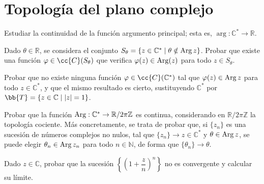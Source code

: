 \section{Topología del plano complejo}

\begin{ejercicio}
    Estudiar la continuidad de la función argumento principal; esta es, $\arg : \mathbb{C}^\ast \to \mathbb{R}$.
\end{ejercicio}

\begin{ejercicio}
    Dado $\theta \in \mathbb{R}$, se considera el conjunto $S_\theta = \{z \in \mathbb{C}^\ast \mid \theta \notin \operatorname{Arg} z\}$. Probar que existe una función $\varphi \in \cc{C}(S_\theta)$ que verifica $\varphi(z) \in \operatorname{Arg} (z)$ para todo $z \in S_\theta$.
\end{ejercicio}

\begin{ejercicio}
    Probar que no existe ninguna función $\varphi \in \cc{C}(\mathbb{C}^\ast)$ tal que $\varphi(z) \in \operatorname{Arg} z$ para todo $z \in \mathbb{C}^\ast$, y que el mismo resultado es cierto, sustituyendo $\mathbb{C}^\ast$ por $\bb{T} = \{z \in \mathbb{C} \mid |z| = 1\}$.
\end{ejercicio}

\begin{ejercicio}
    Probar que la función $\operatorname{Arg} : \mathbb{C}^\ast \to \mathbb{R}/2\pi\mathbb{Z}$ es continua, considerando en $\mathbb{R}/2\pi\mathbb{Z}$ la topología cociente. Más concretamente, se trata de probar que, si $\{z_n\}$ es una sucesión de números complejos no nulos, tal que $\{z_n\} \to z \in \mathbb{C}^\ast$ y $\theta \in \operatorname{Arg} z$, se puede elegir $\theta_n \in \operatorname{Arg} z_n$ para todo $n \in \mathbb{N}$, de forma que $\{\theta_n\} \to \theta$.
\end{ejercicio}

\begin{ejercicio}
    Dado $z \in \mathbb{C}$, probar que la sucesión $\left\{\left(1 + \dfrac{z}{n}\right)^n\right\}$ no es convergente y calcular su límite.
\end{ejercicio}
